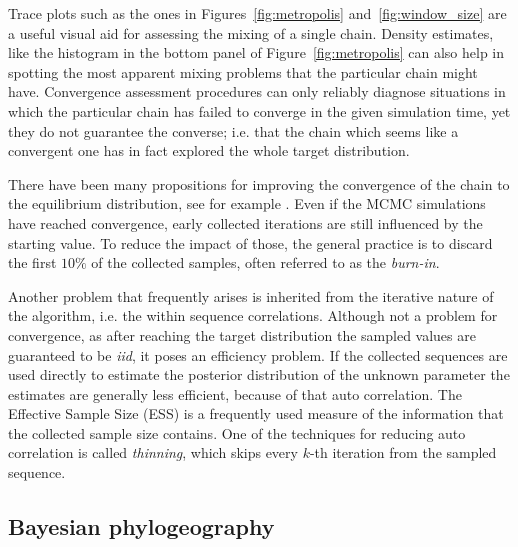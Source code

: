 Trace plots such as the ones in Figures~\ref{fig:metropolis} and~\ref{fig:window_size} are a useful visual aid for assessing the mixing of a single chain.
Density estimates, like the histogram in the bottom panel of Figure~\ref{fig:metropolis} can also help in spotting the most apparent mixing problems that the particular chain might have.
Convergence assessment procedures can only reliably diagnose situations in which the particular chain has failed to converge in the given simulation time, yet they do not guarantee the converse; i.e. that the chain which seems like a convergent one has in fact explored the whole target distribution.

There have been many propositions for improving the convergence of the chain to the equilibrium distribution, see for example \cite{Liu1994, Gelfand1995, Vines1996}.
Even if the MCMC simulations have reached convergence, early collected iterations are still influenced by the starting value.
To reduce the impact of those, the general practice is to discard the first $10\%$ of the collected samples, often referred to as the \textit{burn-in}.

Another problem that frequently arises is inherited from the iterative nature of the algorithm, i.e. the within sequence correlations.
Although not a problem for convergence, as after reaching the target distribution the sampled values are guaranteed to be \textit{iid}, it poses an efficiency problem.
If the collected sequences are used directly to estimate the posterior distribution of the unknown parameter the estimates are generally less efficient, because of that auto correlation.
The Effective Sample Size (ESS) is a frequently used measure of the information that the collected sample size contains.
One of the techniques for reducing auto correlation is called \textit{thinning}, which skips every $k$-th iteration from the sampled sequence. 

\subsection{Bayesian phylogeography\label{sub:phylogeo}}

